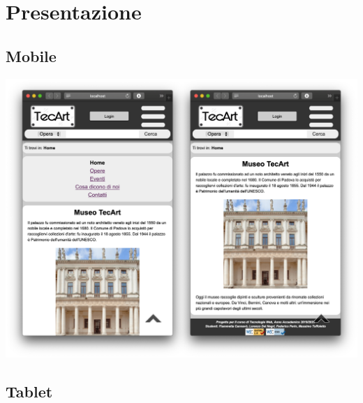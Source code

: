 \section{Presentazione}
\label{presentazione}

\subsection{Mobile}
\label{presentazione-mobile}

\begin{center}
	\includegraphics[scale=0.3]{img/Mobile-pres}
\end{center}

\subsection{Tablet}
\label{presentazione-tablet}

